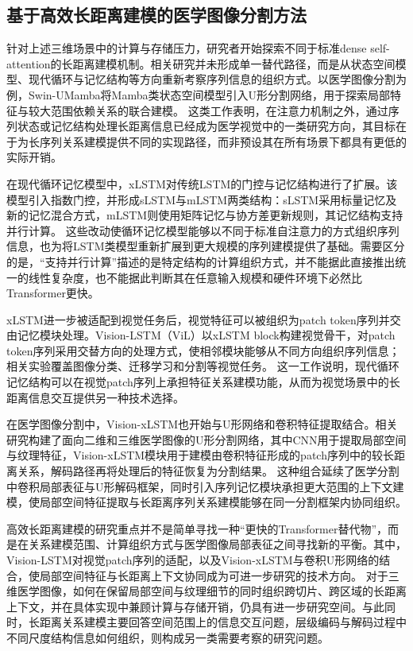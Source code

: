 \subsection{基于高效长距离建模的医学图像分割方法}

针对上述三维场景中的计算与存储压力，研究者开始探索不同于标准dense self-attention的长距离建模机制。相关研究并未形成单一替代路径，而是从状态空间模型、现代循环与记忆结构等方向重新考察序列信息的组织方式。以医学图像分割为例，Swin-UMamba将Mamba类状态空间模型引入U形分割网络，用于探索局部特征与较大范围依赖关系的联合建模。\cite{liu2024swinumamba} 这类工作表明，在注意力机制之外，通过序列状态或记忆结构处理长距离信息已经成为医学视觉中的一类研究方向，其目标在于为长序列关系建模提供不同的实现路径，而非预设其在所有场景下都具有更低的实际开销。

在现代循环记忆模型中，xLSTM对传统LSTM的门控与记忆结构进行了扩展。该模型引入指数门控，并形成sLSTM与mLSTM两类结构：sLSTM采用标量记忆及新的记忆混合方式，mLSTM则使用矩阵记忆与协方差更新规则，其记忆结构支持并行计算。\cite{beck2024xlstm} 这些改动使循环记忆模型能够以不同于标准自注意力的方式组织序列信息，也为将LSTM类模型重新扩展到更大规模的序列建模提供了基础。需要区分的是，“支持并行计算”描述的是特定结构的计算组织方式，并不能据此直接推出统一的线性复杂度，也不能据此判断其在任意输入规模和硬件环境下必然比Transformer更快。

xLSTM进一步被适配到视觉任务后，视觉特征可以被组织为patch token序列并交由记忆模块处理。Vision-LSTM（ViL）以xLSTM block构建视觉骨干，对patch token序列采用交替方向的处理方式，使相邻模块能够从不同方向组织序列信息；相关实验覆盖图像分类、迁移学习和分割等视觉任务。\cite{alkin2025visionlstm} 这一工作说明，现代循环记忆结构可以在视觉patch序列上承担特征关系建模功能，从而为视觉场景中的长距离信息交互提供另一种技术选择。

在医学图像分割中，Vision-xLSTM也开始与U形网络和卷积特征提取结合。相关研究构建了面向二维和三维医学图像的U形分割网络，其中CNN用于提取局部空间与纹理特征，Vision-xLSTM模块用于建模由卷积特征形成的patch序列中的较长距离关系，解码路径再将处理后的特征恢复为分割结果。\cite{dutta2025visionxlstmunet} 这种组合延续了医学分割中卷积局部表征与U形解码框架，同时引入序列记忆模块承担更大范围的上下文建模，使局部空间特征提取与长距离序列关系建模能够在同一分割框架内协同组织。

高效长距离建模的研究重点并不是简单寻找一种“更快的Transformer替代物”，而是在关系建模范围、计算组织方式与医学图像局部表征之间寻找新的平衡。其中，Vision-LSTM对视觉patch序列的适配，以及Vision-xLSTM与卷积U形网络的结合，使局部空间特征与长距离上下文协同成为可进一步研究的技术方向。\cite{alkin2025visionlstm,dutta2025visionxlstmunet} 对于三维医学图像，如何在保留局部空间与纹理细节的同时组织跨切片、跨区域的长距离上下文，并在具体实现中兼顾计算与存储开销，仍具有进一步研究空间。与此同时，长距离关系建模主要回答空间范围上的信息交互问题，层级编码与解码过程中不同尺度结构信息如何组织，则构成另一类需要考察的研究问题。

